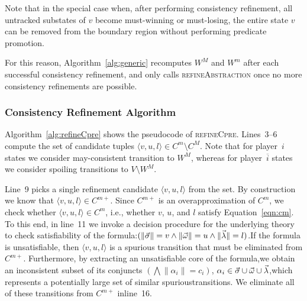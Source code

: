 Note that in the special case when, after performing consistency refinement, all untracked substates of $v$ become must-winning or must-losing, the entire state $v$ can be removed from the boundary region without performing predicate promotion. 

For this reason, Algorithm~\ref{alg:generic} recomputes $W^M$ and $W^m$ after each successful consistency refinement, and only calls \textsc{refineAbstraction} once no more consistency refinements are possible.

\subsubsection{Consistency Refinement Algorithm}

Algorithm~\ref{alg:refineCpre} shows the pseudocode of \textsc{refineCpre}.  Lines~3--6 compute the set of candidate tuples $\langle v, u, l\rangle\in C^m\setminus C^M$.  Note that for player~$i$ states we consider may-consistent transition to $W^M$, whereas for player~$\overline{i}$ states we consider spoiling transitions to $V\setminus W^M$.

Line~9 picks a single refinement candidate $\langle v,u,l \rangle$ from the set.  By construction we know that $\langle v,u,l\rangle\in C^{m+}$.  Since $C^{m+}$ is an overapproximation of $C^m$, we check whether $\langle v,u,l\rangle\in C^m$, i.e., whether $v$, $u$, and $l$ satisfy Equation~\ref{eqn:cm}.  To this end, in line~11 we invoke a decision procedure for the underlying theory to check satisfiability of the formula:$(\|\vec{\sigma}\|=v \land \|\vec{\omega}\|=u \land \|\vec{\lambda}\|=l)$.If the formula is unsatisfiable, then $\langle v,u,l\rangle$ is a spurious transition that must be eliminated from $C^{m+}$.  Furthermore, by extracting an unsatisfiable core of the formula,we obtain an inconsistent subset of its conjuncts $(\bigwedge\|\alpha_i\|=c_i)$, $\alpha_i\in\vec{\sigma}\cup\vec{\omega}\cup\vec{\lambda}$,which represents a potentially large set of similar spurioustransitions.  We eliminate all of these transitions from $C^{m+}$ inline~16.

